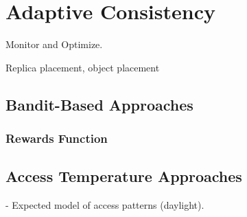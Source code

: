 
\renewcommand{\thechapter}{6}

\chapter{Adaptive Consistency}

Monitor and Optimize.

Replica placement, object placement

\section{Bandit-Based Approaches}

\subsection{Rewards Function}

\section{Access Temperature Approaches}

- Expected model of access patterns (daylight).
